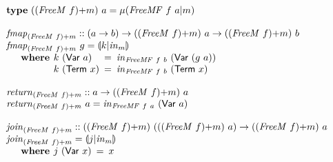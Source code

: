 \documentclass{jfp1}
\newcommand{\eFold}[2]{\llparenthesis #1|#2 \rrparenthesis}
\newcommand{\kw}[1]{\textbf{#1}}
\begin{document}
\begin{figure}
  \centering
  \begin{displaymath}
    \begin{array}{@{}l}
      \kw{type}~(\cprd{(\mathit{FreeM}~f)}{m})~a = \mu(\mathit{FreeMF}~f~a|m) \\
      \\
      \begin{array}{@{}l}
        \mathit{fmap}_{\cprd{(\mathit{FreeM}~f)}{m}} :: (a \to b) \to (\cprd{(\mathit{FreeM}~f)}{m})~a \to (\cprd{(\mathit{FreeM}~f)}{m})~b \\
        \mathit{fmap}_{\cprd{(\mathit{FreeM}~f)}{m}}~g = \eFold{k}{\mathit{in}_m} \\
        \quad\begin{array}{r@{\hspace{0.4em}}l@{\hspace{0.5em}}c@{\hspace{0.5em}}l}
          \kw{where} & k~(\mathsf{Var}~a) &=& \mathit{in}_{\mathit{FreeMF}~f~b}~(\mathsf{Var}~(g~a)) \\
          & k~(\mathsf{Term}~x) &=& \mathit{in}_{\mathit{FreeMF}~f~b}~(\mathsf{Term}~x)
        \end{array}
      \end{array} \\
      \\
      \begin{array}{@{}l}
        \mathit{return}_{\cprd{(\mathit{FreeM}~f)}{m}} :: a \to (\cprd{(\mathit{FreeM}~f)}{m})~a \\
        \mathit{return}_{\cprd{(\mathit{FreeM}~f)}{m}}~a = \mathit{in}_{\mathit{FreeMF}~f~a}~(\mathsf{Var}~a)
      \end{array} \\
      \\
      \begin{array}{@{}l}
        \mathit{join}_{\cprd{(\mathit{FreeM}~f)}{m}} :: (\cprd{(\mathit{FreeM}~f)}{m})~((\cprd{(\mathit{FreeM}~f)}{m})~a) \to (\cprd{(\mathit{FreeM}~f)}{m})~a \\
        \mathit{join}_{\cprd{(\mathit{FreeM}~f)}{m}} = \eFold{j}{\mathit{in}_m} \\
        \quad\begin{array}{r@{\hspace{0.4em}}l@{\hspace{0.5em}}c@{\hspace{0.5em}}l}
          \kw{where} & j~(\mathsf{Var}~x) &=& x \\

\end{array}
\end{array}
\end{array}
\end{displaymath}
\end{figure}
\end{document}
